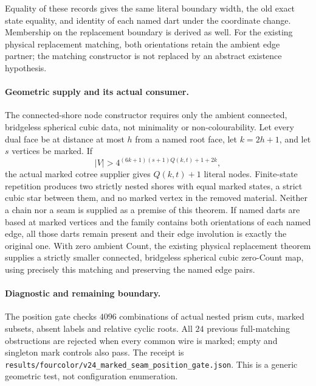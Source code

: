 Equality of these records gives the same literal boundary width, the old
exact state equality, and identity of each named dart under the coordinate
change.  Membership on the replacement boundary is derived as well.
For the existing physical replacement matching, both orientations retain
the ambient edge partner; the matching constructor is not replaced by an
abstract existence hypothesis.

\paragraph{Geometric supply and its actual consumer.}
The connected-shore node constructor requires only the ambient connected,
bridgeless spherical cubic data, not minimality or non-colourability.
Let every dual face be at distance at most $h$ from a named root face,
let $k=2h+1$, and let $s$ vertices be marked.  If
\[
 |V|>4^{(6k+1)(s+1)Q(k,t)+1+2k},
\]
the actual marked cotree supplier gives $Q(k,t)+1$ literal nodes.
Finite-state repetition produces two strictly nested shores with equal
marked states, a strict cubic star between them, and no marked vertex
in the removed material.  Neither a chain nor a seam is supplied as a
premise of this theorem.
If named darts are based at marked vertices and the family contains both
orientations of each named edge, all those darts remain present and their
edge involution is exactly the original one.
With zero ambient Count, the existing physical replacement theorem supplies
a strictly smaller connected, bridgeless spherical cubic zero-Count map,
using precisely this matching and preserving the named edge pairs.

\paragraph{Diagnostic and remaining boundary.}
The position gate checks $4096$ combinations of actual nested prism cuts,
marked subsets, absent labels and relative cyclic roots.  All $24$ previous
full-matching obstructions are rejected when every common wire is marked;
empty and singleton mark controls also pass.  The receipt is
\texttt{results/fourcolor/v24\_marked\_seam\_position\_gate.json}.
This is a generic geometric test, not configuration enumeration.

